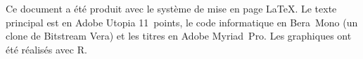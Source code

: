 \clearpage
\thispagestyle{empty}
\vspace*{\fill}
\begin{flushleft}
  \small %
  Ce document a été produit avec le système de mise en page
  {\LaTeX}. Le texte principal est en Adobe Utopia 11~points, le code
  informatique en Bera~Mono (un clone de Bitstream Vera) et les titres
  en Adobe Myriad~Pro. Les graphiques ont été réalisés avec R.
\end{flushleft}
\vfill
